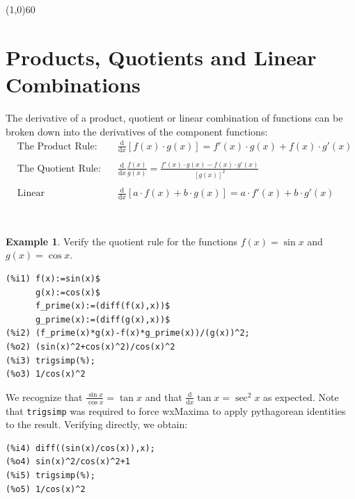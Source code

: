 \documentclass[10.5pt,twoside]{report}
\theoremstyle{definition}
\newtheorem{exmp}{Example}[section]
\begin{document}
\line(1,0){60}
\linethickness{0.5mm}
\pagebreak

\section{Products, Quotients and Linear Combinations}\label{Products, Quotients and Linear Combinations}

The derivative of a product, quotient or linear combination of functions can be broken down into the derivatives of the component functions:\\


\begin{align*}
&\text{The Product Rule:} & &\frac{\mathrm{d}}{\mathrm{d}x}[f(x)\cdot g(x)]=f'(x)\cdot g(x)+f(x)\cdot g'(x)\\ \\
&\text{The Quotient Rule:} & &\frac{\mathrm{d}}{\mathrm{d}x}\frac{f(x)}{g(x)}=\frac{f'(x)\cdot g(x)-f(x)\cdot g'(x)}{[g(x)]^2}\\ \\
&\text{Linear Combinations:} & &\frac{\mathrm{d}}{\mathrm{d}x}[a\cdot f(x)+b\cdot g(x)]=a\cdot f'(x)+b\cdot g'(x)
\end{align*}

${}$\\

\begin{exmp}

Verify the quotient rule for the functions $f(x)=\sin{x}$ and $g(x)=\cos{x}$.\\

\begin{verbatim}
(%i1) f(x):=sin(x)$
      g(x):=cos(x)$
      f_prime(x):=(diff(f(x),x))$
      g_prime(x):=(diff(g(x),x))$
(%i2) (f_prime(x)*g(x)-f(x)*g_prime(x))/(g(x))^2;
(%o2) (sin(x)^2+cos(x)^2)/cos(x)^2
(%i3) trigsimp(%);
(%o3) 1/cos(x)^2
\end{verbatim}

We recognize that $\frac{\sin{x}}{\cos{x}}=\tan{x}$ and that $\frac{\mathrm{d}}{\mathrm{d}x}\tan{x}=\sec^2{x}$ as expected.  Note that \verb|trigsimp| was required to force wxMaxima to apply pythagorean identities to the result.  Verifying directly, we obtain:

\begin{verbatim}
(%i4) diff((sin(x)/cos(x)),x);
(%o4) sin(x)^2/cos(x)^2+1
(%i5) trigsimp(%);
(%o5) 1/cos(x)^2
\end{verbatim}

\end{exmp}
\end{document}
